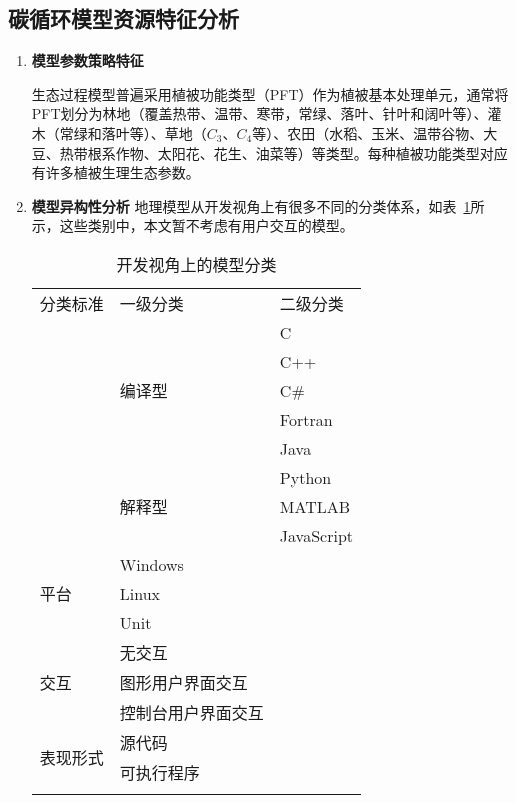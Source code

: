 \subsection{碳循环模型资源特征分析}
\begin{enumerate}[(1)]
    \item \textbf{模型参数策略特征}
    
    生态过程模型普遍采用植被功能类型（PFT）作为植被基本处理单元，通常将PFT划分为林地（覆盖热带、温带、寒带，常绿、落叶、针叶和阔叶等）、灌木（常绿和落叶等）、草地（$C_3$、$C_4$等）、农田（水稻、玉米、温带谷物、大豆、热带根系作物、太阳花、花生、油菜等）等类型。每种植被功能类型对应有许多植被生理生态参数。

    \item \textbf{模型异构性分析}
    地理模型从开发视角上有很多不同的分类体系，如表~\ref{tab:model-language-classify}所示，这些类别中，本文暂不考虑有用户交互的模型。

    \begin{table}
        \centering
        \caption{开发视角上的模型分类}
        \label{tab:model-language-classify}
        \begin{threeparttable}
            \begin{tabular}{l | l l}
                \Xhline{1.5pt}
                分类标准 & 一级分类 & 二级分类 \\
                \Xhline{1.5pt}
                \multirow{8}{*}{语言} & \multirow{5}{*}{编译型} & C \\
                & & C++ \\
                & & C\# \\
                & & Fortran \\
                & & Java \\
                \cline{2-3}
                & \multirow{3}{*}{解释型} & Python\\
                & & MATLAB \\
                & & JavaScript \\
                \hline
                \multirow{3}{*}{平台} & Windows & \\
                & Linux & \\
                & Unit & \\
                \hline
                \multirow{3}{*}{交互} & 无交互 & \\
                & 图形用户界面交互 & \\
                & 控制台用户界面交互 & \\
                \hline
                \multirow{2}{*}{表现形式} & 源代码 & \\
                & 可执行程序 & \\
                \Xhline{1.5pt}
            \end{tabular}
        \end{threeparttable}
    \end{table}

\end{enumerate}


